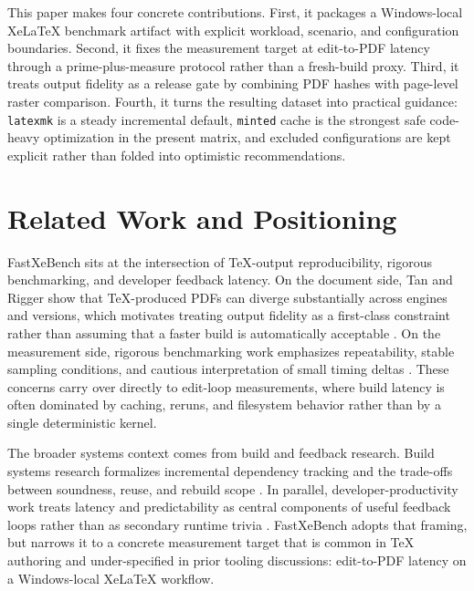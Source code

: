 \documentclass[11pt]{article}
\begin{document}
This paper makes four concrete contributions. First, it packages a Windows-local XeLaTeX benchmark artifact with explicit workload, scenario, and configuration boundaries. Second, it fixes the measurement target at edit-to-PDF latency through a prime-plus-measure protocol rather than a fresh-build proxy. Third, it treats output fidelity as a release gate by combining PDF hashes with page-level raster comparison. Fourth, it turns the resulting dataset into practical guidance: \texttt{latexmk} is a steady incremental default, \texttt{minted} cache is the strongest safe code-heavy optimization in the present matrix, and excluded configurations are kept explicit rather than folded into optimistic recommendations.

\section{Related Work and Positioning}
FastXeBench sits at the intersection of TeX-output reproducibility, rigorous benchmarking, and developer feedback latency. On the document side, Tan and Rigger show that TeX-produced PDFs can diverge substantially across engines and versions, which motivates treating output fidelity as a first-class constraint rather than assuming that a faster build is automatically acceptable \cite{tan2024tex}. On the measurement side, rigorous benchmarking work emphasizes repeatability, stable sampling conditions, and cautious interpretation of small timing deltas \cite{georges2007rigorous,kalibera2013rigorous}. These concerns carry over directly to edit-loop measurements, where build latency is often dominated by caching, reruns, and filesystem behavior rather than by a single deterministic kernel.

The broader systems context comes from build and feedback research. Build systems research formalizes incremental dependency tracking and the trade-offs between soundness, reuse, and rebuild scope \cite{mokhov2020build,erdweg2015incremental}. In parallel, developer-productivity work treats latency and predictability as central components of useful feedback loops rather than as secondary runtime trivia \cite{beller2018feedback,forsgren2021space,jaspan2023build}. FastXeBench adopts that framing, but narrows it to a concrete measurement target that is common in TeX authoring and under-specified in prior tooling discussions: edit-to-PDF latency on a Windows-local XeLaTeX workflow.
\end{document}
